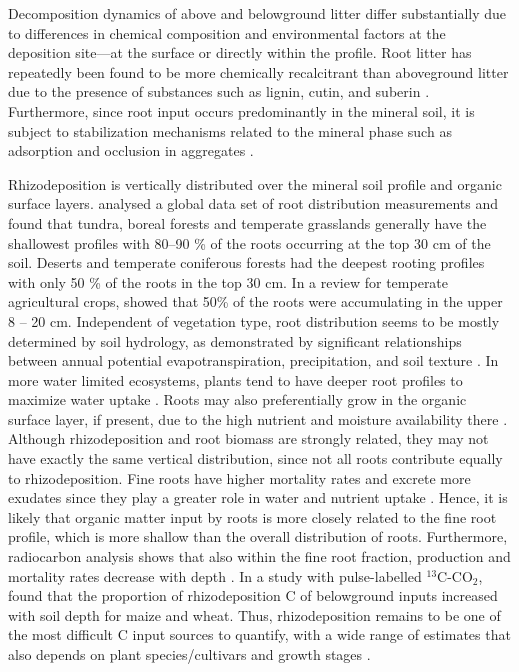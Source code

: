 \documentclass[11pt, oneside, a4paper]{article}   	%
\begin{document}
Decomposition dynamics of above and belowground litter differ substantially
due to differences in chemical composition and environmental factors at the deposition site—at the surface or directly within the profile. Root litter has repeatedly been
found to be more chemically recalcitrant than aboveground litter due to the presence
of substances such as lignin, cutin, and suberin \citep{Rasse2005}. Furthermore,
since root input occurs predominantly in the mineral soil, it is subject to stabilization
mechanisms related to the mineral phase such as adsorption and occlusion in aggregates \citep{Rasse2005}. 

Rhizodeposition is vertically distributed over the mineral soil profile and organic
surface layers. \citet{Jackson2000} analysed a global data set of root distribution
measurements and found that tundra, boreal forests and temperate grasslands generally have the shallowest profiles with 80–90 \% of the roots occurring at the top 30 cm
of the soil. Deserts and temperate coniferous forests had the deepest
rooting profiles with only 50 \% of the roots in the top 30 cm. 
In a review for temperate agricultural crops, \citet{Fan2016} showed that 50\% of the roots were accumulating in the upper 8 -- 20 cm.
Independent of vegetation type, root distribution seems to be mostly determined by soil hydrology, as
demonstrated by significant relationships between annual potential evapotranspiration, precipitation, and soil texture \citep{Schenk2002a}. In more water limited ecosystems, plants tend to have deeper root profiles to maximize water uptake
\citep{Schenk2002b}. Roots may also preferentially grow in the organic surface layer, if present, due to the high nutrient and moisture availability there \citep{Jordan1980, Schenk2002a}.
Although rhizodeposition and root biomass are strongly related, they may not
have exactly the same vertical distribution, since not all roots contribute equally to rhizodeposition. Fine roots have higher mortality rates and excrete more exudates since they
play a greater role in water and nutrient uptake \citep{Anderson2003}. Hence, it
is likely that organic matter input by roots is more closely related to the fine root
profile, which is more shallow than the overall distribution of roots. Furthermore,
radiocarbon analysis shows that also within the fine root fraction, production and mortality rates decrease with depth \citep{Gaudinski2010}.
In a study with pulse-labelled $^{13}$C-CO$_2$, \citet{Hirte2018} found that the proportion of rhizodeposition C of belowground inputs increased with soil depth for maize and wheat. Thus, rhizodeposition remains to be one of the most difficult C input sources to quantify, with a wide range of estimates that also depends on plant species/cultivars and growth stages \citep[e.g.][]{Amos2006, Pausch2018}.
\end{document}
